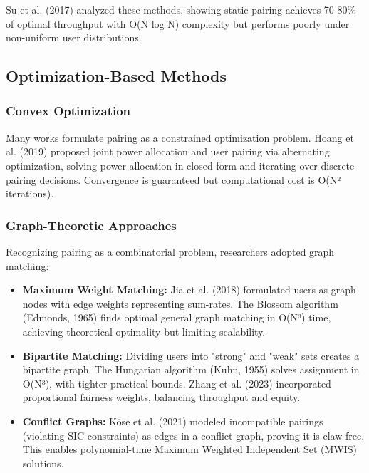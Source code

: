 Su et al. (2017) \cite{su2017noma} analyzed these methods, showing static pairing achieves 70-80\% of optimal throughput with O(N log N) complexity but performs poorly under non-uniform user distributions.

\subsection{Optimization-Based Methods}

\subsubsection{Convex Optimization}

Many works formulate pairing as a constrained optimization problem. Hoang et al. (2019) proposed joint power allocation and user pairing via alternating optimization, solving power allocation in closed form and iterating over discrete pairing decisions. Convergence is guaranteed but computational cost is O(N² iterations).

\subsubsection{Graph-Theoretic Approaches}

Recognizing pairing as a combinatorial problem, researchers adopted graph matching:

\begin{itemize}
    \item \textbf{Maximum Weight Matching:} Jia et al. (2018) \cite{jia2018graph} formulated users as graph nodes with edge weights representing sum-rates. The Blossom algorithm (Edmonds, 1965) \cite{edmonds1965paths} finds optimal general graph matching in O(N³) time, achieving theoretical optimality but limiting scalability.
    
    \item \textbf{Bipartite Matching:} Dividing users into "strong" and "weak" sets creates a bipartite graph. The Hungarian algorithm (Kuhn, 1955) \cite{kuhn1955hungarian} solves assignment in O(N³), with tighter practical bounds. Zhang et al. (2023) \cite{sensors2023} incorporated proportional fairness weights, balancing throughput and equity.
    
    \item \textbf{Conflict Graphs:} Köse et al. (2021) \cite{kose2021graph} modeled incompatible pairings (violating SIC constraints) as edges in a conflict graph, proving it is claw-free. This enables polynomial-time Maximum Weighted Independent Set (MWIS) solutions.
\end{itemize}

